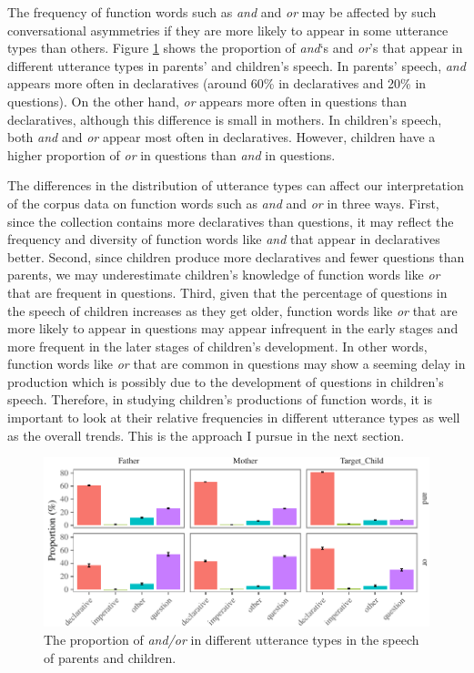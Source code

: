 \documentclass[oneside]{report}
\theoremstyle{definition}
\theoremstyle{definition}
\theoremstyle{definition}
\theoremstyle{remark}
\begin{document}
The frequency of function words such as \emph{and} and \emph{or} may be
affected by such conversational asymmetries if they are more likely to
appear in some utterance types than others. Figure
\ref{fig:CnctPropbySpeechAct} shows the proportion of \emph{and}`s and
\emph{or}'s that appear in different utterance types in parents' and
children's speech. In parents' speech, \emph{and} appears more often in
declaratives (around 60\% in declaratives and 20\% in questions). On the
other hand, \emph{or} appears more often in questions than declaratives,
although this difference is small in mothers. In children's speech, both
\emph{and} and \emph{or} appear most often in declaratives. However,
children have a higher proportion of \emph{or} in questions than
\emph{and} in questions.

The differences in the distribution of utterance types can affect our
interpretation of the corpus data on function words such as \emph{and}
and \emph{or} in three ways. First, since the collection contains more
declaratives than questions, it may reflect the frequency and diversity
of function words like \emph{and} that appear in declaratives better.
Second, since children produce more declaratives and fewer questions
than parents, we may underestimate children's knowledge of function
words like \emph{or} that are frequent in questions. Third, given that
the percentage of questions in the speech of children increases as they
get older, function words like \emph{or} that are more likely to appear
in questions may appear infrequent in the early stages and more frequent
in the later stages of children's development. In other words, function
words like \emph{or} that are common in questions may show a seeming
delay in production which is possibly due to the development of
questions in children's speech. Therefore, in studying children's
productions of function words, it is important to look at their relative
frequencies in different utterance types as well as the overall trends.
This is the approach I pursue in the next section.
\begin{figure}[tb]

{\centering \includegraphics{figs/CnctPropbySpeechAct-1} 

}

\caption{The proportion of \textit{and/or} in different utterance types in the speech of parents and children.}\label{fig:CnctPropbySpeechAct}
\end{figure}
\end{document}
